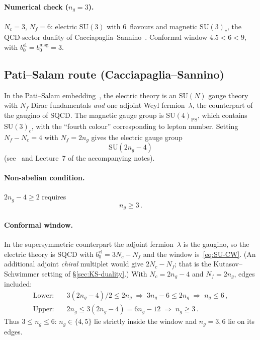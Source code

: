 \documentclass[11pt,a4paper]{article}
\theoremstyle{plain}
\theoremstyle{definition}
\theoremstyle{remark}
\newcommand{\Nc}{N_{\!c}}
\newcommand{\Nf}{N_{\!f}}
\newcommand{\ngen}{n_g}
\newcommand{\SU}[1]{\mathrm{SU}(#1)}
\begin{document}
\paragraph{Numerical check ($\ngen = 3$).}
$\Nc = 3$, $\Nf = 6$: electric $\SU{3}$ with 6~flavours and magnetic
$\SU{3}_c$, the QCD-sector duality of
Cacciapaglia--Sannino~\cite{CacciapagliaSannino2024}.  Conformal window
$4.5 < 6 < 9$, with $b_0^{\mathrm{el}} = b_0^{\mathrm{mag}} = 3$.
\checkmark

\subsection{Pati--Salam route (Cacciapaglia--Sannino)}
\label{ssec:pati-salam}

In the Pati--Salam
embedding~\cite{PS1974,Sannino2011,CacciapagliaSannino2024}, the
electric theory is an $\SU{N}$ gauge theory with $\Nf$ Dirac
fundamentals \emph{and} one adjoint Weyl fermion~$\lambda$, the
counterpart of the gaugino of SQCD.  The magnetic gauge group is
$\SU{4}_{\mathrm{PS}}$, which contains $\SU{3}_c$, with the ``fourth
colour'' corresponding to lepton number.  Setting $\Nf - \Nc = 4$ with
$\Nf = 2\ngen$ gives the electric gauge group
\begin{equation}\label{eq:PS-electric}
  \boxed{\SU{2\ngen - 4}}
\end{equation}
(see~\cite{Sannino2011,CacciapagliaSannino2024} and Lecture~7 of the
accompanying notes).

\paragraph{Non-abelian condition.}
$2\ngen - 4 \geq 2$ requires
\begin{equation}\label{eq:PS-bound}
  \boxed{\ngen \geq 3}\,.
\end{equation}

\paragraph{Conformal window.}
In the supersymmetric counterpart the adjoint fermion~$\lambda$ is the
gaugino, so the electric theory is SQCD with
$b_0^{\mathrm{el}} = 3\Nc - \Nf$ and the window is~\eqref{eq:SU-CW}.
(An additional adjoint \emph{chiral} multiplet would give
$2\Nc - \Nf$; that is the Kutasov--Schwimmer setting of
\S\ref{sec:KS-duality}.)  With $\Nc = 2\ngen - 4$ and $\Nf = 2\ngen$,
edges included:
\begin{align}
  \text{Lower:}&\quad 3(2\ngen - 4)/2 \leq 2\ngen
  \;\Longrightarrow\;
  3\ngen - 6 \leq 2\ngen
  \;\Longrightarrow\;
  \ngen \leq 6\,,
  \label{eq:PS-CW-lower} \\
  \text{Upper:}&\quad 2\ngen \leq 3(2\ngen - 4) = 6\ngen - 12
  \;\Longrightarrow\;
  \ngen \geq 3\,.
  \label{eq:PS-CW-upper}
\end{align}
Thus $3 \leq \ngen \leq 6$: $\ngen \in \{4, 5\}$ lie strictly inside the
window and $\ngen = 3, 6$ lie on its edges.
\end{document}
